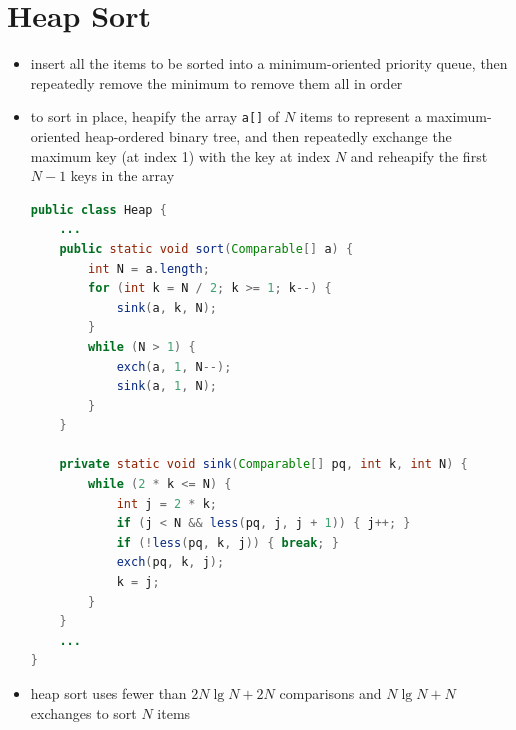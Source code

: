 \documentclass[8pt,a4paper,compress]{beamer}
\begin{document}
\section{Heap Sort}
\begin{frame}[fragile]
\begin{itemize}
\item insert all the items to be sorted into a minimum-oriented priority queue, then repeatedly remove the minimum to remove them all in order

\item to sort in place, heapify the array \lstinline$a[]$ of $N$ items to  represent a maximum-oriented heap-ordered binary tree, and then repeatedly exchange the maximum key (at index 1) with the key at index $N$ and reheapify the first $N - 1$ keys in the array 
\begin{lstlisting}[language=Java]
public class Heap {
    ...
    public static void sort(Comparable[] a) {
        int N = a.length;
        for (int k = N / 2; k >= 1; k--) {
            sink(a, k, N);
        }
        while (N > 1) {
            exch(a, 1, N--);
            sink(a, 1, N);
        }
    }
    
    private static void sink(Comparable[] pq, int k, int N) {
        while (2 * k <= N) {
            int j = 2 * k;
            if (j < N && less(pq, j, j + 1)) { j++; }
            if (!less(pq, k, j)) { break; }
            exch(pq, k, j);
            k = j;
        }
    }
    ...
}
\end{lstlisting}

\item heap sort uses fewer than $2N \lg N + 2N$ comparisons and $N\lg N + N$ exchanges to sort $N$ items
\end{itemize}
\end{frame}
\end{document}
